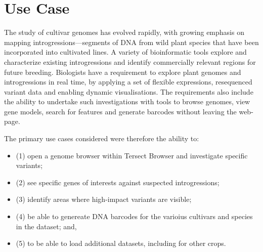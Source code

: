 \documentclass[12pt]{article}
\begin{document}
\section{Use Case}

The study of cultivar genomes has evolved rapidly, with growing emphasis on mapping introgressions—segments of DNA from wild plant species that have been incorporated into cultivated lines. A variety of bioinformatic tools explore and characterize existing introgressions and identify commercially relevant regions for future breeding. Biologists have a requirement to explore plant genomes and introgressions in real time, by applying a set of flexible expressions, resequenced variant data and enabling dynamic visualisations. The requirements also include the ability to undertake such investigations with tools to browse genomes, view gene models, search for features and generate barcodes without leaving the web-page. 

The primary use cases considered were therefore the ability to: 

\begin{itemize}
    \item (1) open a genome browser within Tersect Browser and investigate specific variants;
    \item (2) see specific genes of interests against suspected introgressions; 
    \item (3) identify areas where high-impact variants are visible; 
    \item (4) be able to genereate DNA barcodes for the varioius cultivars and species in the dataset; and,  
    \item (5) to be able to load additional datasets, including for other crops. 
\end{itemize}

\end{document}
